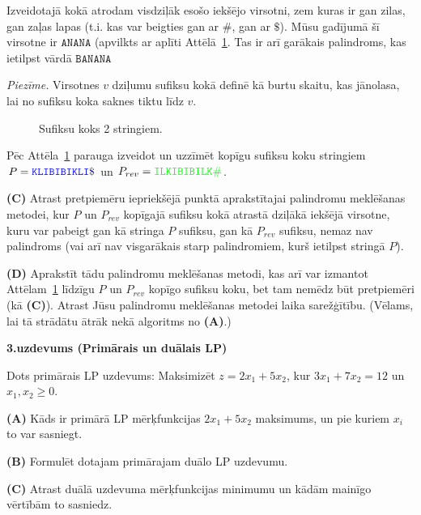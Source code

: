 \documentclass[a4paper]{article}
\begin{document}
Izveidotajā kokā atrodam visdziļāk esošo 
iekšējo virsotni, zem kuras ir gan zilas, gan zaļas lapas (t.i. kas var beigties 
gan ar $\texttt{\#}$, gan ar $\texttt{\$}$).
Mūsu gadījumā šī virsotne ir $\mathtt{ANANA}$ (apvilkts ar aplīti Attēlā~\ref{fig:banana-suffix-tree}.
Tas ir arī garākais palindroms, kas ietilpst vārdā $\mathtt{BANANA}$

\vspace{5pt} 
{\em Piezīme.} Virsotnes $v$ dziļumu sufiksu kokā definē kā burtu skaitu, kas jānolasa, lai 
no sufiksu koka saknes tiktu līdz $v$.


\begin{figure}[!htb]
\caption{\label{fig:banana-suffix-tree} Sufiksu koks 2 stringiem.}
\end{figure}

Pēc Attēla~\ref{fig:banana-suffix-tree} parauga izveidot un uzzīmēt kopīgu sufiksu koku stringiem\\
$P = \textcolor{blue}{\mathtt{KLIBIBIKLI\$}}$ un 
$P_{rev} = \textcolor{green}{\mathtt{ILKIBIBILK\#}}$. 


\vspace{5pt}
{\bf (C)} Atrast pretpiemēru iepriekšējā punktā aprakstītajai
palindromu meklēšanas metodei, kur $P$ un $P_{rev}$ kopīgajā sufiksu kokā
atrastā dziļākā iek\-šē\-jā virsotne, 
kuru var pabeigt gan kā stringa $P$ sufiksu, gan kā $P_{rev}$ sufiksu, nemaz nav palindroms
(vai arī nav visgarākais starp palindromiem, kurš ietilpst stringā $P$).  

\vspace{5pt}
{\bf (D)} Aprakstīt tādu palindromu meklēšanas me\-to\-di, kas arī 
var izmantot Attēlam~\ref{fig:banana-suffix-tree} līdzīgu 
$P$ un $P_{rev}$ kopīgo sufiksu koku, bet tam nemēdz būt pretpiemēri (kā {\bf (C)}). 
Atrast Jūsu palindromu meklēšanas metodei laika sarežģītību.
(Vēlams, lai tā strādātu ātrāk nekā algoritms no {\bf (A)}.)



\vspace{20pt}
{\bf 3.uzdevums (Primārais un duālais LP)}

Dots primārais LP uzdevums: Maksimizēt $z = 2x_1 + 5x_2$, 
kur $3x_1 + 7x_2 = 12$ un $x_1,x_2 \geq 0$.

\vspace{5pt}
{\bf (A)} Kāds ir primārā LP mērķfunkcijas $2x_1 + 5x_2$ maksimums, un pie kuriem $x_i$ to var sasniegt.

\vspace{5pt}
{\bf (B)} Formulēt dotajam primārajam duālo LP uzdevumu.

\vspace{5pt}
{\bf (C)} 
Atrast duālā uzdevuma mērķfunkcijas minimumu un kādām mainīgo vērtībām to sasniedz.
\end{document}
